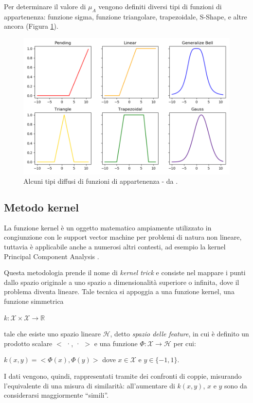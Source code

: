 \documentclass[12pt]{report}
\theoremstyle{definition}
\begin{document}
Per determinare il valore di $\mu_A$ vengono definiti diversi tipi di funzioni di appartenenza: funzione sigma, funzione triangolare, trapezoidale, S-Shape, e altre ancora (Figura \ref{membership_functions}). 
\begin{figure}
    \centering
    \includegraphics[scale = 0.7]{images/membership_functions.png}
    \caption{Alcuni tipi diffusi di funzioni di appartenenza - da \cite{30}.}
    \label{membership_functions}
\end{figure}
\subsection{Metodo kernel} \label{kernel}
La funzione kernel è un oggetto matematico ampiamente utilizzato in congiunzione con le support vector machine \cite{28} per problemi di natura non lineare, tuttavia è applicabile anche a numerosi altri contesti, ad esempio la kernel Principal Component Analysis \cite{29}.

Questa metodologia prende il nome di \textit{kernel trick} e consiste nel mappare i punti dallo spazio originale a uno spazio a dimensionalità superiore o infinita, dove il problema diventa lineare.
Tale tecnica si appoggia a una funzione kernel, una funzione simmetrica 
\begin{center}
    $k: \mathcal{X} \times \mathcal{X} \rightarrow \mathbb{R}$
\end{center} 
tale che esiste uno spazio lineare $\mathcal{H}$, detto \textit{spazio delle feature}, in cui è definito un prodotto scalare $<$ ·, · $>$ e una funzione $\mathit{\Phi }: \mathcal{X} \rightarrow \mathcal{H}$ per cui:
\begin{center}
    $k(x,y) = <\mathit{\Phi}(x), \mathit{\Phi}(y)>$ dove $x \in \mathcal{X}$ e $y \in \{-1,1\}$.
\end{center}
I dati vengono, quindi, rappresentati tramite dei confronti di coppie, misurando l'equivalente di una misura di similarità: all'aumentare di $k(x,y)$, $x$ e $y$ sono da considerarsi maggiormente  ``simili''.
\end{document}
